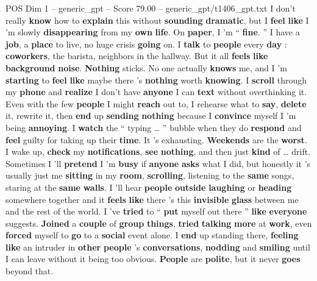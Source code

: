 \begin{textsample}{POS Dim 1 – generic\_gpt – Score 79.00 – generic\_gpt/t1406\_gpt.txt}  \label{ex:f1_pos_018}
I don't really \textbf{know} how to \textbf{explain} this without \textbf{sounding} \textbf{dramatic}, but I \textbf{feel} \textbf{like} I ’m slowly \textbf{disappearing} from my \textbf{own} \textbf{life}.
On \textbf{paper}, I ’m “ \textbf{fine}. ” I have a \textbf{job}, a \textbf{place} to live, no huge crisis \textbf{going} on.
I \textbf{talk} to \textbf{people} every \textbf{day} : \textbf{coworkers}, the barista, neighbors in the hallway.
But it all \textbf{feels} \textbf{like} \textbf{background} \textbf{noise}. \textbf{Nothing} sticks.
No one actually \textbf{knows} me, and I ’m \textbf{starting} to \textbf{feel} \textbf{like} maybe there ’s \textbf{nothing} worth \textbf{knowing}.
I \textbf{scroll} through my \textbf{phone} and \textbf{realize} I don't have \textbf{anyone} I can \textbf{text} without overthinking it.
Even with the few \textbf{people} I might \textbf{reach} out to, I rehearse what to \textbf{say}, \textbf{delete} it, rewrite it, then \textbf{end} up \textbf{sending} \textbf{nothing} because I \textbf{convince} myself I ’m being \textbf{annoying}.
I \textbf{watch} the “ typing … ” bubble when they do \textbf{respond} and \textbf{feel} guilty for taking up their \textbf{time}.
It ’s exhausting. \textbf{Weekends} are the \textbf{worst}.
I wake up, \textbf{check} my \textbf{notifications}, \textbf{see} \textbf{nothing}, and then just \textbf{kind} of … drift.
Sometimes I ’ll \textbf{pretend} I ’m \textbf{busy} if \textbf{anyone} \textbf{asks} what I did, but honestly it ’s usually just me \textbf{sitting} in my \textbf{room}, \textbf{scrolling}, listening to the \textbf{same} songs, staring at the \textbf{same} \textbf{walls}.
I ’ll hear \textbf{people} \textbf{outside} \textbf{laughing} or \textbf{heading} somewhere together and it \textbf{feels} \textbf{like} there ’s this \textbf{invisible} \textbf{glass} between me and the rest of the world.
I ’ve \textbf{tried} to “ \textbf{put} myself out there ” \textbf{like} \textbf{everyone} suggests. \textbf{Joined} a \textbf{couple} of \textbf{group} \textbf{things}, \textbf{tried} \textbf{talking} \textbf{more} at \textbf{work}, even \textbf{forced} myself to \textbf{go} to a \textbf{social} event alone.
I \textbf{end} up standing there, \textbf{feeling} \textbf{like} an intruder in \textbf{other} \textbf{people} ’s \textbf{conversations}, \textbf{nodding} and \textbf{smiling} until I can leave without it being too obvious. \textbf{People} are \textbf{polite}, but it never \textbf{goes} beyond that.

\end{textsample}
